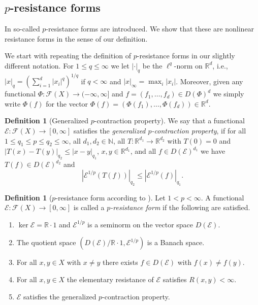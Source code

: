 \documentclass[a4paper,11pt,reqno]{amsart}
\theoremstyle{definition}
\newtheorem{definition}[lemma]{Definition}
\numberwithin{equation}{section}
\newcommand{\cE}{{\mathcal E}}
\newcommand{\cF}{{\mathcal F}}
\newcommand{\R}{{\mathbb R}}
\newcommand{\N}{{\mathbb N}}
\newcommand{\1}{\mathds{1}}
\begin{document}
\subsection{$p$-resistance forms} \label{subsection:p-resistance forms}

In \cite{KS25} so-called $p$-resistance forms are introduced. We show that these are nonlinear resistance forms in the sense of our definition. 

We start with repeating the definition of $p$-resistance forms in our slightly different notation.  For $1 \leq q \leq \infty$ we let $|\cdot|_q$ be the $\ell^q$-norm on $\R^d$, i.e., 
%
$|x|_q =  (\sum_{i = 1}^d |x_i|^q)^{1/q}$ if $q < \infty$ and $|x|_\infty = \max_i |x_i|$. Moreover, given any functional $\Phi \colon \cF(X) \to (-\infty,\infty]$ and $f = (f_1,\ldots,f_d) \in D(\Phi)^d$  we simply write $\Phi(f)$ for the vector $\Phi(f) = (\Phi(f_1),\ldots,\Phi(f_d)) \in \R^d.$
%


\begin{definition}[Generalized $p$-contraction property]
We say that a functional $\cE \colon \cF(X) \to [0,\infty]$ satisfies the {\em generalized $p$-contraction property}, if for all $1 \leq q_1 \leq p \leq q_2 \leq \infty$, all $d_1,d_2 \in \N$, all $T \colon \R^{d_1} \to \R^{d_2}$ with $T(0) = 0$ and $|T(x)-T(y)|_{q_2} \leq |x-y|_{q_1}$, $x,y \in \R^{d_1}$, and all $f \in D(\cE)^{d_1}$ we have $T(f) \in D(\cE)^{d_2}$ and 
%
$$|\cE^{1/p}(T(f))|_{q_2} \leq |\cE^{1/p}(f)|_{q_1}. $$
%
\end{definition}



\begin{definition}[$p$-resistance form according to \cite{KS25}] \label{definition:p resistance form}
 Let $1 < p < \infty$. A functional $\cE \colon \cF(X) \to [0,\infty]$ is called a {\em $p$-resistance form} if the following are satisfied. 
 \begin{enumerate}[(RF1)$_p$]
  \item   $\ker \cE = \R \cdot 1$  and $\cE^{1/p}$ is a seminorm on the vector space $D(\cE)$.
  \item The quotient space $(D(\cE)/ \R \cdot 1, \cE^{1/p})$ is a Banach space. 
  \item For all $x,y \in X$ with $x \neq y$ there exists $f \in D(\cE)$ with $f(x) \neq f(y)$. 
  \item For all $x,y \in X$ the elementary resistance of $\cE$ satisfies $R(x,y) < \infty$. 
  \item $\cE$ satisfies the generalized $p$-contraction property.
 \end{enumerate}
\end{definition}
\end{document}
